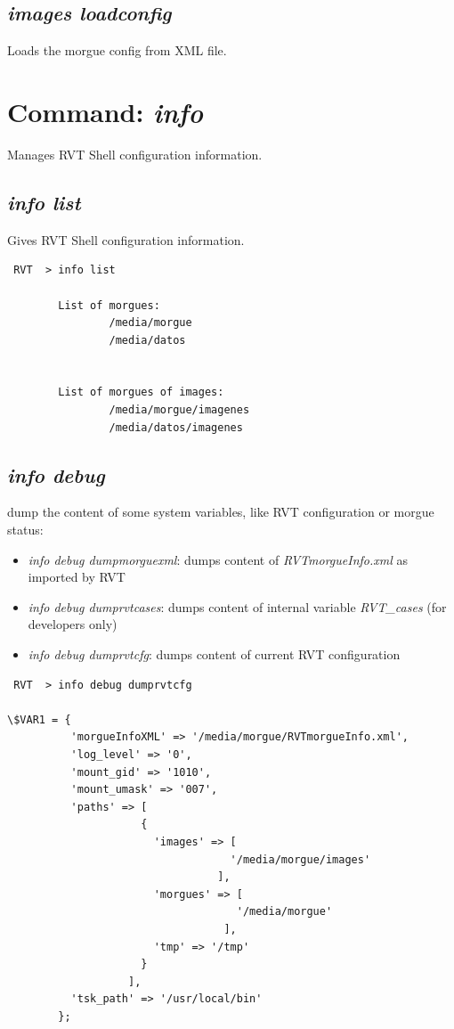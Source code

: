 \documentclass[a4paper,11pt,oneside]{report}
\begin{document}
\subsection{\emph{images loadconfig}}

Loads the morgue config from XML file.


\section{Command: \emph{info}}

Manages RVT Shell configuration information.

\subsection{\emph{info list}}

Gives RVT Shell configuration information.

\begin{verbatim}
 RVT  > info list

        List of morgues:
                /media/morgue 
                /media/datos 


        List of morgues of images:
                /media/morgue/imagenes 
                /media/datos/imagenes 
\end{verbatim}



\subsection{\emph{info debug}} \label{cmd:info-debug}

dump the content of some system variables, like RVT configuration or morgue status:

\begin{itemize}
\item \emph{info debug dumpmorguexml}: dumps content of \emph{RVTmorgueInfo.xml} as imported by RVT
\item \emph{info debug dumprvtcases}: dumps content of internal variable \emph{RVT\_cases} (for developers only)
\item \emph{info debug dumprvtcfg}: dumps content of current RVT configuration
\end{itemize}

\begin{verbatim}
 RVT  > info debug dumprvtcfg                                                 

\$VAR1 = {
          'morgueInfoXML' => '/media/morgue/RVTmorgueInfo.xml',
          'log_level' => '0',
          'mount_gid' => '1010',
          'mount_umask' => '007',
          'paths' => [
                     {
                       'images' => [
                                   '/media/morgue/images'
                                 ],
                       'morgues' => [
                                    '/media/morgue'
                                  ],
                       'tmp' => '/tmp'
                     }
                   ],
          'tsk_path' => '/usr/local/bin'
        };
\end{verbatim}
\end{document}
